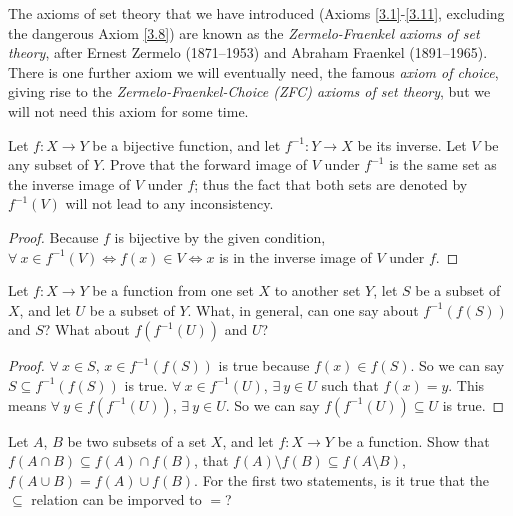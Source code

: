 \setcounter{theorem}{11}
\begin{remark}\label{3.4.12}
The axioms of set theory that we have introduced (Axioms \ref{3.1}-\ref{3.11}, excluding the dangerous Axiom \ref{3.8}) are known as the \emph{Zermelo-Fraenkel axioms of set theory}, after Ernest Zermelo (1871--1953) and Abraham Fraenkel (1891--1965).
There is one further axiom we will eventually need, the famous \emph{axiom of choice}, giving rise to the \emph{Zermelo-Fraenkel-Choice (ZFC) axioms of set theory}, but we will not need this axiom for some time.
\end{remark}

\exercisesection

\begin{exercise}\label{ex 3.4.1}
Let \(f : X \to Y\) be a bijective function, and let \(f^{-1} : Y \to X\) be its inverse.
Let \(V\) be any subset of \(Y\).
Prove that the forward image of \(V\) under \(f^{-1}\) is the same set as the inverse image of \(V\) under \(f\);
thus the fact that both sets are denoted by \(f^{-1}(V)\) will not lead to any inconsistency.
\end{exercise}

\begin{proof}
Because \(f\) is bijective by the given condition, \(\forall\ x \in f^{-1}(V) \iff f(x) \in V \iff x\) is in the inverse image of \(V\) under \(f\).
\end{proof}

\begin{exercise}\label{ex 3.4.2}
Let \(f : X \to Y\) be a function from one set \(X\) to another set \(Y\), let \(S\) be a subset of \(X\), and let \(U\) be a subset of \(Y\).
What, in general, can one say about \(f^{-1}(f(S))\) and \(S\)?
What about \(f(f^{-1}(U))\) and \(U\)?
\end{exercise}

\begin{proof}
\(\forall\ x \in S\), \(x \in f^{-1}(f(S))\) is true because \(f(x) \in f(S)\).
So we can say \(S \subseteq f^{-1}(f(S))\) is true.
\(\forall\ x \in f^{-1}(U)\), \(\exists\ y \in U\) such that \(f(x) = y\).
This means \(\forall\ y \in f(f^{-1}(U))\), \(\exists\ y \in U\).
So we can say \(f(f^{-1}(U)) \subseteq U\) is true.
\end{proof}

\begin{exercise}\label{ex 3.4.3}
Let \(A\), \(B\) be two subsets of a set \(X\), and let \(f : X \to Y\) be a function.
Show that \(f(A \cap B) \subseteq f(A) \cap f(B)\), that \(f(A) \setminus f(B) \subseteq f(A \setminus B)\), \(f(A \cup B) = f(A) \cup f(B)\).
For the first two statements, is it true that the \(\subseteq\) relation can be imporved to \(=\)?
\end{exercise}

